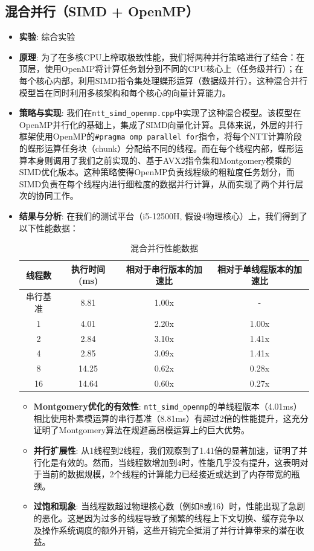 \documentclass[a4paper]{article}
\begin{document}
\subsection{混合并行（SIMD + OpenMP）}
\begin{itemize}
    \item \textbf{实验}: 综合实验
    \item \textbf{原理}: 为了在多核CPU上榨取极致性能，我们将两种并行策略进行了结合：在顶层，使用OpenMP将计算任务划分到不同的CPU核心上（任务级并行）；在每个核心内部，利用SIMD指令集处理蝶形运算（数据级并行）。这种混合并行模型旨在同时利用多核架构和每个核心的向量计算能力。
    \item \textbf{策略与实现}: 我们在\texttt{ntt\_simd\_openmp.cpp}中实现了这种混合模型。该模型在OpenMP并行化的基础上，集成了SIMD向量化计算。具体来说，外层的并行框架使用OpenMP的\texttt{\#pragma omp parallel for}指令，将每个NTT计算阶段的蝶形运算任务块（chunk）分配给不同的线程。而在每个线程内部，蝶形运算本身则调用了我们之前实现的、基于AVX2指令集和Montgomery模乘的SIMD优化版本。这种策略使得OpenMP负责线程级的粗粒度任务划分，而SIMD负责在每个线程内进行细粒度的数据并行计算，从而实现了两个并行层次的协同工作。
    \item \textbf{结果与分析}: 在我们的测试平台（i5-12500H, 假设4物理核心）上，我们得到了以下性能数据：
    \begin{table}[H]
        \centering
        \caption{混合并行性能数据}
        \label{tab:hybrid_perf}
        \begin{tabular}{cccc}
        \toprule
        \textbf{线程数} & \textbf{执行时间 (ms)} & \textbf{相对于串行版本的加速比} & \textbf{相对于单线程版本的加速比} \\
        \midrule
        串行基准 & 8.81 & 1.00x & - \\
        1 & 4.01 & 2.20x & 1.00x \\
        2 & 2.84 & 3.10x & 1.41x \\
        4 & 2.85 & 3.09x & 1.41x \\
        8 & 14.25 & 0.62x & 0.28x \\
        16 & 14.64 & 0.60x & 0.27x \\
        \bottomrule
        \end{tabular}
    \end{table}
    \begin{itemize}
        \item \textbf{Montgomery优化的有效性}: \texttt{ntt\_simd\_openmp}的单线程版本（4.01ms）相比使用朴素模运算的串行基准（8.81ms）有超过2倍的性能提升，这充分证明了Montgomery算法在规避高昂模运算上的巨大优势。
        \item \textbf{并行扩展性}: 从1线程到2线程，我们观察到了1.41倍的显著加速，证明了并行化是有效的。然而，当线程数增加到4时，性能几乎没有提升，这表明对于当前的数据规模，2个线程的计算能力已经接近或达到了内存带宽的瓶颈。
        \item \textbf{过饱和现象}: 当线程数超过物理核心数（例如8或16）时，性能出现了急剧的恶化。这是因为过多的线程导致了频繁的线程上下文切换、缓存竞争以及操作系统调度的额外开销，这些开销完全抵消了并行计算带来的潜在收益。
    \end{itemize}
\end{itemize}
\end{document}
